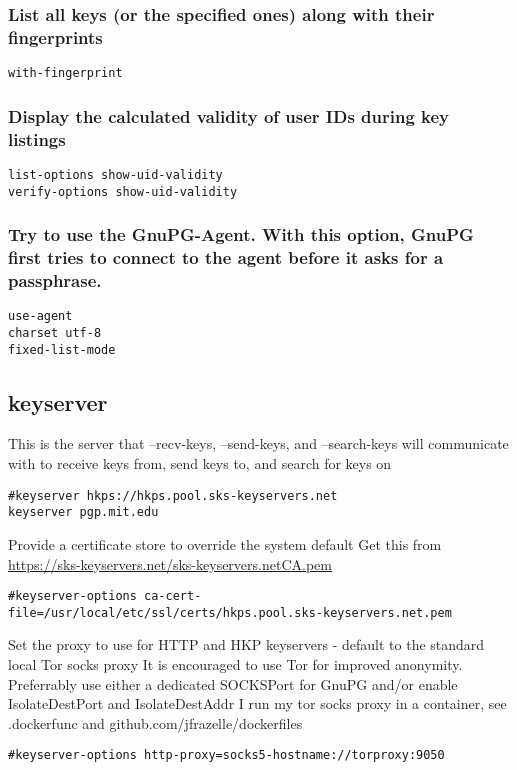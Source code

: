 \documentclass[11pt]{article}
\begin{document}
\subsubsection{List all keys (or the specified ones) along with their fingerprints}
\label{sec:org92188c1}
\begin{verbatim}
with-fingerprint
\end{verbatim}
\subsubsection{Display the calculated validity of user IDs during key listings}
\label{sec:orga8a0eef}
\begin{verbatim}
list-options show-uid-validity
verify-options show-uid-validity
\end{verbatim}
\subsubsection{Try to use the GnuPG-Agent. With this option, GnuPG first tries to connect to the agent before it asks for a passphrase.}
\label{sec:org1ea8e3e}
\begin{verbatim}
use-agent
charset utf-8
fixed-list-mode
\end{verbatim}
\subsection{keyserver}
\label{sec:org4e8d02a}
This is the server that --recv-keys, --send-keys, and --search-keys will communicate with to receive keys from, send keys to, and search for keys on
\begin{verbatim}
#keyserver hkps://hkps.pool.sks-keyservers.net
keyserver pgp.mit.edu
\end{verbatim}

Provide a certificate store to override the system default
Get this from \url{https://sks-keyservers.net/sks-keyservers.netCA.pem}
\begin{verbatim}
#keyserver-options ca-cert-file=/usr/local/etc/ssl/certs/hkps.pool.sks-keyservers.net.pem
\end{verbatim}


Set the proxy to use for HTTP and HKP keyservers - default to the standard local Tor socks proxy
It is encouraged to use Tor for improved anonymity. Preferrably use either a dedicated SOCKSPort for GnuPG and/or enable IsolateDestPort and IsolateDestAddr
I run my tor socks proxy in a container, see .dockerfunc and github.com/jfrazelle/dockerfiles
\begin{verbatim}
#keyserver-options http-proxy=socks5-hostname://torproxy:9050
\end{verbatim}
\end{document}
